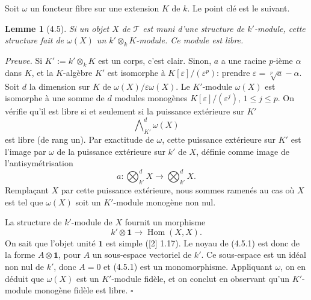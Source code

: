 \documentclass[10pt]{article}
\newcommand{\Hom}{\operatorname{Hom}}
\newcommand{\T}{\mathcal T}
\newcommand{\one}{\mathbf{1}}
\theoremstyle{deligne}
\newtheorem*{lemma*}{Lemme}
\newenvironment{proofdel}{\textit{Preuve.}}{\hfill$\square$}
\newcommand{\heading}[1]{\vspace{0.7em}\noindent{\bfseries #1}\quad}
\begin{document}
\heading{Preuve si \(k'=k(a^{1/p})\).}
Soit \(\omega\) un foncteur fibre sur une extension \(K\) de \(k\). Le point clé est le suivant.

\begin{lemma*}[4.5]
Si un objet \(X\) de \(\T\) est muni d'une structure de \(k'\)-module, cette structure fait de \(\omega(X)\) un \(k'\otimes_k K\)-module. Ce module est libre.
\end{lemma*}

\begin{proofdel}
Si \(K':=k'\otimes_k K\) est un corps, c'est clair. Sinon, \(a\) a une racine \(p\)-ième \(\alpha\) dans \(K\), et la \(K\)-algèbre \(K'\) est isomorphe à \(K[\varepsilon]/(\varepsilon^p)\): prendre \(\varepsilon=\sqrt[p]{a}-\alpha\). Soit \(d\) la dimension sur \(K\) de \(\omega(X)/\varepsilon\omega(X)\). Le \(K'\)-module \(\omega(X)\) est isomorphe à une somme de \(d\) modules monogènes \(K[\varepsilon]/(\varepsilon^j)\), \(1\le j\le p\). On vérifie qu'il est libre si et seulement si la puissance extérieure sur \(K'\)
\[
\bigwedge\nolimits^d_{K'}\omega(X)
\]
est libre (de rang un). Par exactitude de \(\omega\), cette puissance extérieure sur \(K'\) est l'image par \(\omega\) de la puissance extérieure sur \(k'\) de \(X\), définie comme image de l'antisymétrisation
\[
a:\bigotimes\nolimits^d_{k'}X\longrightarrow \bigotimes\nolimits^d_{k'}X.
\]
Remplaçant \(X\) par cette puissance extérieure, nous sommes ramenés au cas où \(X\) est tel que \(\omega(X)\) soit un \(K'\)-module monogène non nul.

La structure de \(k'\)-module de \(X\) fournit un morphisme
\[
\tag{4.5.1}
k'\otimes \one\longrightarrow \Hom(X,X).
\]
On sait que l'objet unité \(\one\) est simple ([2] 1.17). Le noyau de (4.5.1) est donc de la forme \(A\otimes\one\), pour \(A\) un sous-espace vectoriel de \(k'\). Ce sous-espace est un idéal non nul de \(k'\), donc \(A=0\) et (4.5.1) est un monomorphisme. Appliquant \(\omega\), on en déduit que \(\omega(X)\) est un \(K'\)-module fidèle, et on conclut en observant qu'un \(K'\)-module monogène fidèle est libre.
\end{proofdel}
\end{document}
